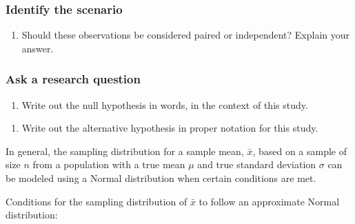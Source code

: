 \documentclass[
]{report}
\providecommand{\tightlist}{%
  \setlength{\itemsep}{0pt}\setlength{\parskip}{0pt}}
\begin{document}
\hypertarget{identify-the-scenario}{%
\subsubsection*{Identify the scenario}\label{identify-the-scenario}}

\begin{enumerate}
\def\labelenumi{\arabic{enumi}.}
\tightlist
\item
  Should these observations be considered paired or independent? Explain your answer.
  \vspace{0.5in}
\end{enumerate}

\hypertarget{ask-a-research-question-1}{%
\subsubsection*{Ask a research question}\label{ask-a-research-question-1}}

\begin{enumerate}
\def\labelenumi{\arabic{enumi}.}
\setcounter{enumi}{1}
\tightlist
\item
  Write out the null hypothesis in words, in the context of this study.
\end{enumerate}

\vspace{0.8in}

\begin{enumerate}
\def\labelenumi{\arabic{enumi}.}
\setcounter{enumi}{2}
\tightlist
\item
  Write out the alternative hypothesis in proper notation for this study.
\end{enumerate}

\vspace{0.5in}

In general, the sampling distribution for a sample mean, \(\bar{x}\), based on a sample of size \(n\) from a population with a true mean \(\mu\) and true standard deviation \(\sigma\) can be modeled using a Normal distribution when certain conditions are met.

Conditions for the sampling distribution of \(\bar{x}\) to follow an approximate Normal distribution:
\end{document}
